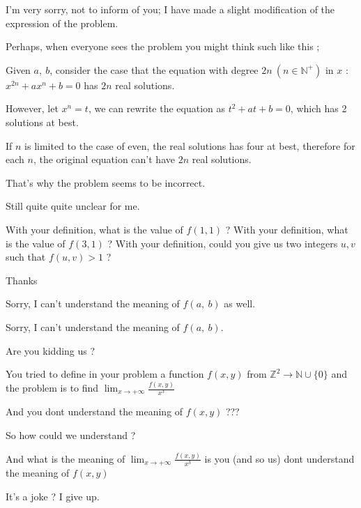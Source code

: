 \begin{solution}
	\begin{tcolorbox}I'm very sorry, not to inform of you; I have made a slight modification of the expression of the problem.

Perhaps, when everyone sees the problem you might think such like this ;

Given $a,\ b$, consider the case that the equation with degree $2n\ (n\in{\mathbb{N^{+}}})$ in $x$ : $x^{2n}+ax^n+b=0$ has $2n$ real solutions.

However, let $x^{n}=t$, we can rewrite the equation as $t^2+at+b=0$, which has 2 solutions at best.

If $n$ is limited to the case of even, the real solutions has four at best, therefore for each $n$, the original equation can't have $2n$ real solutions.

That's why the problem seems to be incorrect.\end{tcolorbox}
Still quite quite unclear for me.

With your definition, what is the value of $f(1,1)$ ?
With your definition, what is the value of $f(3,1)$ ?
With your definition, could you give us two integers $u,v$ such that $f(u,v)>1$ ?

Thanks
\end{solution}



\begin{solution}
	Sorry, I can't understand the meaning of $f(a,\ b)$ as well.
\end{solution}



\begin{solution}
	\begin{tcolorbox}Sorry, I can't understand the meaning of $f(a,\ b)$.\end{tcolorbox}
Are you kidding us ?

You tried to define in your problem a function $f(x,y)$ from $\mathbb Z^2\to \mathbb N\cup\{0\}$ and the problem is to find $\lim_{x\to+\infty}\frac{f(x,y)}{x^3}$

And you dont understand the meaning of $f(x,y)$ ???

So how could we understand ?

And what is the meaning of $\lim_{x\to+\infty}\frac{f(x,y)}{x^3}$ is you (and so us) dont understand the meaning of $f(x,y)$

It's a joke ?
I give up.
\end{solution}



